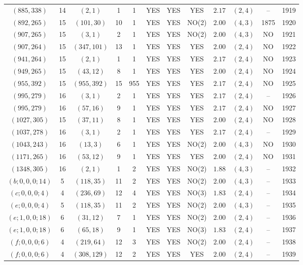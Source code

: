 \begin{longtable}{|c|c|c|c|c|c|c|c|c|c|c|c|}
$(885,338)$ & 14 & $(2,1)$ & 1 & 1 & YES & YES & YES & $2.17$ & $(2,4)$ & -- & 1919\\
$(892,265)$ & 15 & $(101,30)$ & 10 & 1 & YES & YES & NO(2) & $2.00$ & $(4,3)$ & 1875 & 1920\\
$(907,265)$ & 15 & $(3,1)$ & 2 & 1 & YES & YES & NO(2) & $2.00$ & $(4,3)$ & NO & 1921\\
$(907,264)$ & 15 & $(347,101)$ & 13 & 1 & YES & YES & YES & $2.00$ & $(2,4)$ & NO & 1922\\
$(941,264)$ & 15 & $(2,1)$ & 1 & 1 & YES & YES & YES & $2.17$ & $(2,4)$ & NO & 1923\\
$(949,265)$ & 15 & $(43,12)$ & 8 & 1 & YES & YES & YES & $2.00$ & $(2,4)$ & NO & 1924\\
$(955,392)$ & 15 & $(955,392)$ & 15 & 955 & YES & YES & YES & $2.17$ & $(2,4)$ & NO & 1925\\
$(995,279)$ & 16 & $(3,1)$ & 2 & 1 & YES & YES & YES & $2.17$ & $(2,4)$ & -- & 1926\\
$(995,279)$ & 16 & $(57,16)$ & 9 & 1 & YES & YES & YES & $2.17$ & $(2,4)$ & NO & 1927\\
$(1027,305)$ & 15 & $(37,11)$ & 8 & 1 & YES & YES & YES & $2.00$ & $(2,4)$ & NO & 1928\\
$(1037,278)$ & 16 & $(3,1)$ & 2 & 1 & YES & YES & YES & $2.17$ & $(2,4)$ & -- & 1929\\
$(1043,243)$ & 16 & $(13,3)$ & 6 & 1 & YES & YES & NO(2) & $2.00$ & $(4,3)$ & NO & 1930\\
$(1171,265)$ & 16 & $(53,12)$ & 9 & 1 & YES & YES & YES & $2.00$ & $(2,4)$ & NO & 1931\\
$(1348,305)$ & 16 & $(2,1)$ & 1 & 2 & YES & YES & NO(2) & $1.88$ & $(4,3)$ & -- & 1932\\
$(b;0,0,0;14)$ & 5 & $(118,35)$ & 11 & 2 & YES & YES & NO(2) & $2.00$ & $(4,3)$ & -- & 1933\\
$(c;0,0,0;4)$ & 4 & $(236,69)$ & 12 & 4 & YES & YES & NO(3) & $1.83$ & $(2,4)$ & -- & 1934\\
$(e;0,0,0;4)$ & 5 & $(118,35)$ & 11 & 2 & YES & YES & NO(2) & $2.00$ & $(4,3)$ & -- & 1935\\
$(e;1,0,0;18)$ & 6 & $(31,12)$ & 7 & 1 & YES & YES & NO(2) & $2.00$ & $(2,4)$ & -- & 1936\\
$(e;1,0,0;18)$ & 6 & $(65,18)$ & 9 & 1 & YES & YES & NO(3) & $1.83$ & $(2,4)$ & -- & 1937\\
$(f;0,0,0;6)$ & 4 & $(219,64)$ & 12 & 3 & YES & YES & NO(2) & $2.00$ & $(2,4)$ & -- & 1938\\
$(f;0,0,0;6)$ & 4 & $(308,129)$ & 12 & 2 & YES & YES & YES & $2.00$ & $(2,4)$ & -- & 1939
\end{longtable}
